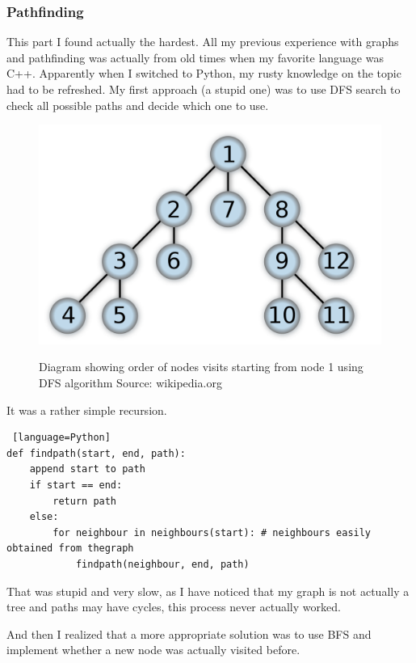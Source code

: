\documentclass[11pt,a4paper,notitlepage]{report}
\newenvironment{img}{
	\begin{center}
		\begin{figure}[H]
			\begin{center}
			
}{
	\end{center}
		\end{figure}
			\end{center}
}
\begin{document}
				\subsubsection{Pathfinding}
					This part I found actually the hardest. All my previous experience with graphs and pathfinding was actually from old times when my favorite language was C++. Apparently when I switched to Python, my rusty knowledge on the topic had to be refreshed. My first approach (a stupid one) was to use DFS search to check all possible paths and decide which one to use.
					\begin{img}
						\includegraphics[width=350pt]{images/dfs-diagram}\\
						\caption{Diagram showing order of nodes visits starting from node 1 using DFS algorithm Source: wikipedia.org}
						\label{DFSalg}
					\end{img}
					It was a rather simple recursion.
					\begin{lstlisting} [language=Python]
def findpath(start, end, path):
	append start to path
	if start == end:
		return path
	else:
		for neighbour in neighbours(start): # neighbours easily obtained from thegraph
			findpath(neighbour, end, path)
					\end{lstlisting}
					That was stupid and very slow, as I have noticed that my graph is not actually a tree and paths may have cycles, this process never actually worked.
					
					And then I realized that a more appropriate solution was to use BFS and implement whether a new node was actually visited before.
					
\end{document}
